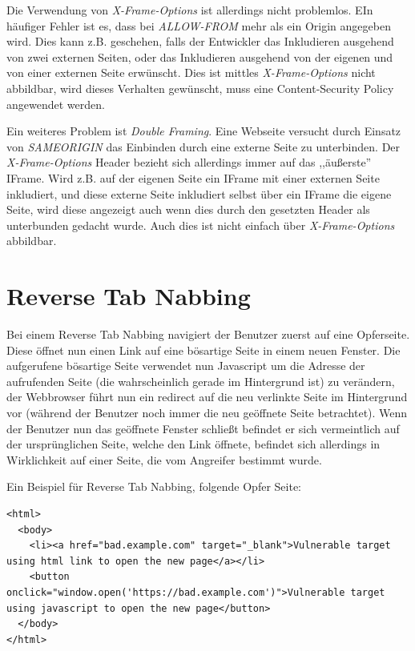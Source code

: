 Die Verwendung von \textit{X-Frame-Options} ist allerdings nicht problemlos. EIn häufiger Fehler ist es, dass bei \textit{ALLOW-FROM} mehr als ein Origin angegeben wird. Dies kann z.B. geschehen, falls der Entwickler das Inkludieren ausgehend von zwei externen Seiten, oder das Inkludieren ausgehend von der eigenen und von einer externen Seite erwünscht. Dies ist mittles \textit{X-Frame-Options} nicht abbildbar, wird dieses Verhalten gewünscht, muss eine Content-Security Policy angewendet werden.

Ein weiteres Problem ist \textit{Double Framing}. Eine Webseite versucht durch Einsatz von \textit{SAMEORIGIN} das Einbinden durch eine externe Seite zu unterbinden. Der \textit{X-Frame-Options} Header bezieht sich allerdings immer auf das ,,äußerste'' IFrame. Wird z.B. auf der eigenen Seite ein IFrame mit einer externen Seite inkludiert, und diese externe Seite inkludiert selbst über ein IFrame die eigene Seite, wird diese angezeigt auch wenn dies durch den gesetzten Header als unterbunden gedacht wurde. Auch dies ist nicht einfach über \textit{X-Frame-Options} abbildbar.

\section{Reverse Tab Nabbing}

Bei einem Reverse Tab Nabbing navigiert der Benutzer zuerst auf eine Opferseite. Diese öffnet nun einen Link auf eine bösartige Seite in einem neuen Fenster. Die aufgerufene bösartige Seite verwendet nun Javascript um die Adresse der aufrufenden Seite (die wahrscheinlich gerade im Hintergrund ist) zu verändern, der Webbrowser führt nun ein redirect auf die neu verlinkte Seite im Hintergrund vor (während der Benutzer noch immer die neu geöffnete Seite betrachtet). Wenn der Benutzer nun das geöffnete Fenster schließt befindet er sich vermeintlich auf der ursprünglichen Seite, welche den Link öffnete, befindet sich allerdings in Wirklichkeit auf einer Seite, die vom Angreifer bestimmt wurde.

Ein Beispiel für Reverse Tab Nabbing, folgende Opfer Seite:

\begin{verbatim}
<html>
  <body>
    <li><a href="bad.example.com" target="_blank">Vulnerable target using html link to open the new page</a></li>
    <button onclick="window.open('https://bad.example.com')">Vulnerable target using javascript to open the new page</button>
  </body>
</html>
\end{verbatim}

